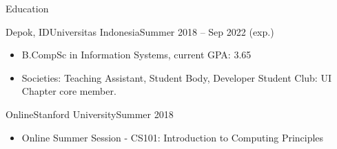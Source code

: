 \documentclass[]{mcdowellcv}
\begin{document}
	\makeheader
	

	\begin{cvsection}{Education}
		\begin{cvsubsection}{Depok, ID}{Universitas Indonesia}{Summer 2018 -- Sep 2022 (exp.)}
			\begin{itemize}
				\item B.CompSc in Information Systems, current GPA: 3.65
				\item Societies: Teaching Assistant, Student Body, Developer Student Club: UI Chapter core member.
			\end{itemize}
		\end{cvsubsection}
		\begin{cvsubsection}{Online}{Stanford University}{Summer 2018}
			\begin{itemize}
				\item Online Summer Session - CS101: Introduction to Computing Principles
			\end{itemize}
		\end{cvsubsection}
	\end{cvsection}
\end{document}
